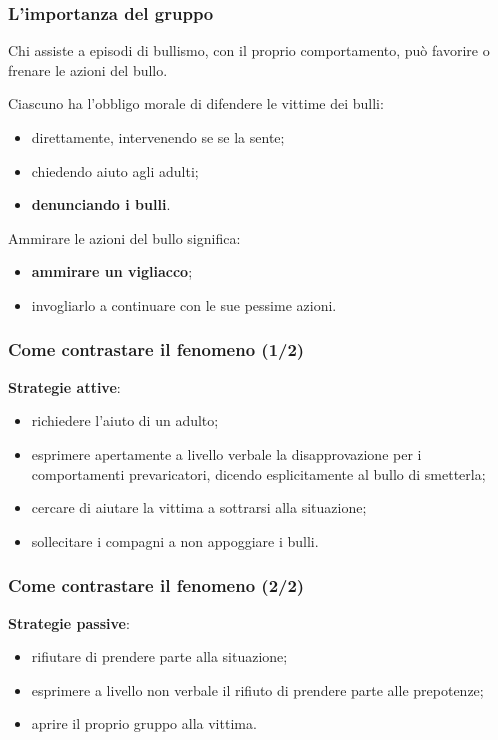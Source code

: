 \documentclass[13pt]{beamer}
\begin{document}
	\begin{frame}
		\frametitle{L'importanza del gruppo}
		Chi assiste a episodi di bullismo, con il proprio comportamento, può favorire o frenare le azioni del bullo.
		
		Ciascuno ha l'obbligo morale di difendere le vittime dei bulli:
		\begin{itemize}
			\item direttamente, intervenendo se se la sente;
			\item chiedendo aiuto agli adulti;
			\item \textbf{denunciando i bulli}.
		\end{itemize}
		
		Ammirare le azioni del bullo significa:
		\begin{itemize}
			\item \textbf{ammirare un vigliacco};
			\item invogliarlo a continuare con le sue pessime azioni.
		\end{itemize} 
	\end{frame}

	\begin{frame}
		\frametitle{Come contrastare il fenomeno (1/2)}
		\textbf{Strategie attive}:
		\begin{itemize}
			\item richiedere l'aiuto di un adulto;
			\item esprimere apertamente a livello verbale la disapprovazione per i comportamenti prevaricatori, dicendo esplicitamente al bullo di smetterla;
			\item cercare di aiutare la vittima a sottrarsi alla situazione;
			\item sollecitare i compagni a non appoggiare i bulli.
		\end{itemize}
	\end{frame}

	\begin{frame}
		\frametitle{Come contrastare il fenomeno (2/2)}
		\textbf{Strategie passive}:
		\begin{itemize}
			\item rifiutare di prendere parte alla situazione;
			\item esprimere a livello non verbale il rifiuto di prendere parte alle prepotenze;
			\item aprire il proprio gruppo alla vittima.
			
		\end{itemize}
	\end{frame}
\end{document}
